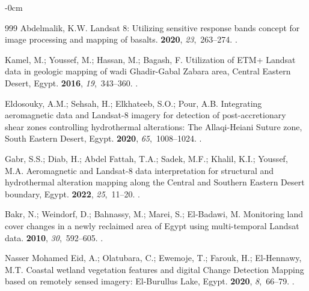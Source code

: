 \documentclass[information,article,accept,pdftex,moreauthors]{Definitions/mdpi}
\begin{document}
\begin{adjustwidth}{-\extralength}{0cm}
\begin{thebibliography}{999}
Abdelmalik, K.W.
\newblock Landsat 8: Utilizing sensitive response bands concept for image
  processing and mapping of basalts.
 {\bf
  2020}, {\em 23},~263--274.
.

Kamel, M.; Youssef, M.; Hassan, M.; Bagash, F.
\newblock Utilization of ETM+ Landsat data in geologic mapping of wadi
  Ghadir-Gabal Zabara area, Central Eastern Desert, Egypt.
 {\bf
  2016}, {\em 19},~343--360.
.

Eldosouky, A.M.; Sehsah, H.; Elkhateeb, S.O.; Pour, A.B.
\newblock Integrating aeromagnetic data and Landsat-8 imagery for detection of
  post-accretionary shear zones controlling hydrothermal alterations: The
  Allaqi-Heiani Suture zone, South Eastern Desert, Egypt.
 {\bf 2020}, {\em 65},~1008--1024.
.

Gabr, S.S.; Diab, H.; {Abdel Fattah}, T.A.; Sadek, M.F.; Khalil, K.I.; Youssef,
  M.A.
\newblock Aeromagnetic and Landsat-8 data interpretation for structural and
  hydrothermal alteration mapping along the Central and Southern Eastern Desert
  boundary, Egypt.
 {\bf
  2022}, {\em 25},~11--20.
.

Bakr, N.; Weindorf, D.; Bahnassy, M.; Marei, S.; El-Badawi, M.
\newblock Monitoring land cover changes in a newly reclaimed area of Egypt
  using multi-temporal Landsat data.
 {\bf 2010}, {\em 30},~592--605.
.

{Nasser Mohamed Eid}, A.; Olatubara, C.; Ewemoje, T.; Farouk, H.; El-Hennawy,
  M.T.
\newblock Coastal wetland vegetation features and digital Change Detection
  Mapping based on remotely sensed imagery: El-Burullus Lake, Egypt.
 {\bf 2020},
  {\em 8},~66--79.
.


\end{thebibliography}
\end{adjustwidth}
\end{document}
